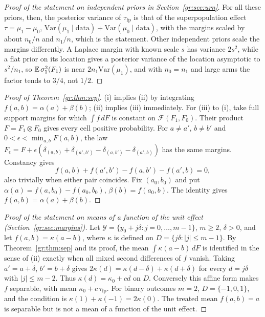 \begin{proof}[Proof of the statement on independent priors in Section~\ref{gr:sec:urn}]
For all these priors, then, the posterior variance of $\tau_{\mathrm{fp}}$ is that of the superpopulation effect $\tau=\mu_1-\mu_0$, $\mathrm{Var}(\mu_1\mid\text{data})+\mathrm{Var}(\mu_0\mid\text{data})$, with the margins scaled by about $n_0/n$ and $n_1/n$, which is the statement. Other independent priors scale the margins differently. A Laplace margin with known scale $s$ has variance $2s^2$, while a flat prior on its location gives a posterior variance of the location asymptotic to $s^2/n_1$, so $\mathbb{E}\,\sigma_1^2(F_1)$ is near $2n_1\mathrm{Var}(\mu_1)$, and with $n_0=n_1$ and large arms the factor tends to $3/4$, not $1/2$.
\end{proof}

\begin{proof}[Proof of Theorem~\ref{gr:thm:sep}]
(i) implies (ii) by integrating $f(a,b)=\alpha(a)+\beta(b)$; (ii) implies (iii) immediately. For (iii) to (i), take full support margins for which $\int f\,dF$ is constant on $\mathcal F(F_1,F_0)$. Their product $F=F_1\otimes F_0$ gives every cell positive probability. For $a\ne a'$, $b\ne b'$ and $0<\epsilon<\min_{a,b}F(a,b)$, the law $F_\epsilon=F+\epsilon(\delta_{(a,b)}+\delta_{(a',b')}-\delta_{(a,b')}-\delta_{(a',b)})$ has the same margins. Constancy gives
\[
f(a,b)+f(a',b')-f(a,b')-f(a',b)=0,
\]
also trivially when either pair coincides. Fix $(a_0,b_0)$ and put $\alpha(a)=f(a,b_0)-f(a_0,b_0)$, $\beta(b)=f(a_0,b)$. The identity gives $f(a,b)=\alpha(a)+\beta(b)$.
\end{proof}

\begin{proof}[Proof of the statement on means of a function of the unit effect (Section~\ref{gr:sec:margins})]
Let $\mathcal Y=\{y_0+j\delta:j=0,\dots,m-1\}$, $m\ge2$, $\delta>0$, and let $f(a,b)=\kappa(a-b)$, where $\kappa$ is defined on $D=\{j\delta:|j|\le m-1\}$. By Theorem~\ref{gr:thm:sep} and its proof, the mean $\int\kappa(a-b)\,dF$ is identified in the sense of (ii) exactly when all mixed second differences of $f$ vanish. Taking $a'=a+\delta$, $b'=b+\delta$ gives $2\kappa(d)=\kappa(d-\delta)+\kappa(d+\delta)$ for every $d=j\delta$ with $|j|\le m-2$. Thus $\kappa(d)=\kappa_0+cd$ on $D$. Conversely this affine form makes $f$ separable, with mean $\kappa_0+c\,\tau_{\mathrm{fp}}$. For binary outcomes $m=2$, $D=\{-1,0,1\}$, and the condition is $\kappa(1)+\kappa(-1)=2\kappa(0)$. The treated mean $f(a,b)=a$ is separable but is not a mean of a function of the unit effect.
\end{proof}


